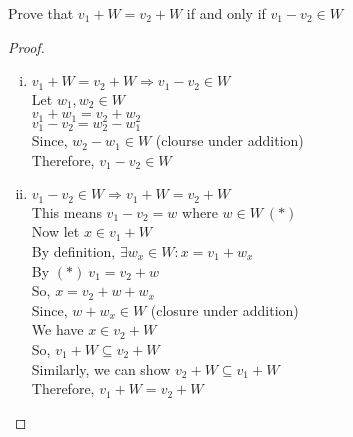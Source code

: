 \documentclass[11pt]{scrartcl}
\begin{document}
\begin{enumerate}[label=\alph*.]
{{		 Prove that $v_1 + W = v_2 + W$ if and only if $v_1 - v_2 \in W$
		 \begin{proof}
			 \-\
			\begin{enumerate}[i.]
			\item{
				$v_1 + W = v_2 + W \Rightarrow v_1 - v_2 \in W$\\
				Let $w_1, w_2 \in W$\\
				$v_1 + w_1 = v_2 + w_2$\\
				$v_1 - v_2 = w_2 - w_1$\\
				Since, $w_2 - w_1 \in W$ (clourse under addition)\\
				Therefore, $v_1 - v_2 \in W$
				}
			\item{
				$v_1 - v_2 \in W \Rightarrow v_1 + W = v_2 + W $\\
				This means $v_1 - v_2 = w$ where $w \in W \ (*)$\\
				Now let $x \in v_1 + W$\\
				By definition, $\exists w_x \in W : x = v_1 + w_x$\\
				By $(*) \ v_1 = v_2 + w$\\
				So, $x = v_2 + w + w_x$\\
				Since, $w + w_x \in W$ (closure under addition)\\
				We have $x \in v_2 + W$\\
				So, $v_1 + W \subseteq v_2 + W$\\
				Similarly, we can show $v_2 + W \subseteq v_1 + W$\\
				Therefore, $v_1 + W = v_2 + W$

}
\end{enumerate}
\end{proof}}}
\end{enumerate}
\end{document}
